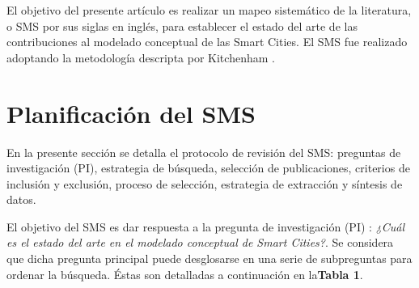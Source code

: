 \documentclass[runningheads,a4paper,spanish]{llncs}
\begin{document}



El objetivo del presente artículo es realizar un mapeo sistemático de la
literatura, o SMS por sus siglas en inglés, para establecer el estado del arte
de las contribuciones al modelado conceptual de las Smart Cities. El SMS fue realizado adoptando la metodología descripta por Kitchenham \cite{kitchenham_guidelines_2007}.



%

\section{Planificación del SMS}\label{metodo}

En la presente sección se detalla el protocolo de revisión del SMS:
preguntas de investigación (PI), estrategia de búsqueda, selección de
publicaciones, criterios de inclusión y exclusión, proceso de selección,
estrategia de extracción y síntesis de datos.

El objetivo del SMS es dar respuesta a la pregunta de investigación (PI) :
\textit{¿Cuál es el estado del arte en el modelado conceptual de Smart
Cities?}. Se considera que dicha pregunta principal puede desglosarse en una
serie de subpreguntas para ordenar la búsqueda. Éstas son detalladas a
continuación en la\textbf{Tabla 1}.
\end{document}
